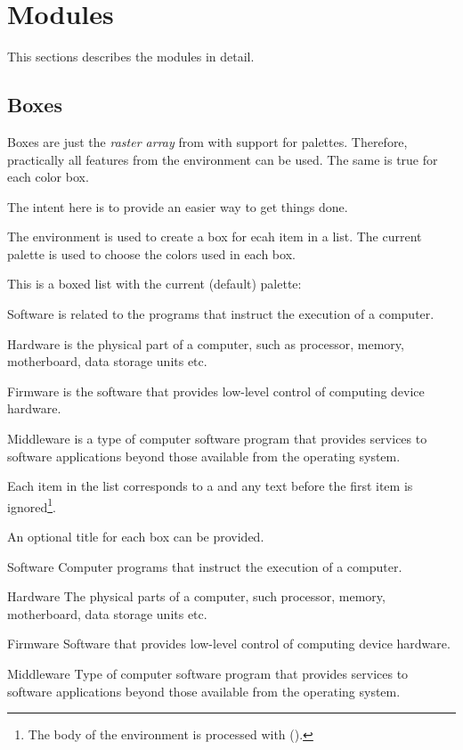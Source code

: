 \documentclass[a4paper, 11pt]{article}
\begin{document}
\section{Modules}

This sections describes the modules in detail.

\subsection{Boxes}\label{sec:boxes}

Boxes are just the \textit{raster array} from  with support for palettes. Therefore, practically all features from the  environment can be used. The same is true for each color box.

The intent here is to provide an easier way to get things done.

The environment  is used to create a box for ecah item in a list. The current palette is used to choose the colors used in each box.

\begin{example}{}
    This is a boxed list with the current (default) palette:

    \begin{PLTBoxItemize}
        \item Software is related to the programs that instruct the execution of a computer.
        \item Hardware is the physical part of a computer, such as processor, memory, motherboard, data storage units etc.
        \item Firmware is the software that provides low-level control of computing device hardware.
        \item Middleware is a type of computer software program that provides services to software applications beyond those available from the operating system.
    \end{PLTBoxItemize}
\end{example}

Each item in the list corresponds to a  and any text before the first item is ignored\footnote{The body of the environment is processed with  ().}.

An optional title for each box can be provided.

\begin{example}{}
    \begin{PLTBoxItemize}
        \item[Software] Computer programs that instruct the execution of a computer.
        \item[Hardware] The physical parts of a computer, such processor, memory, motherboard, data storage units etc.
        \item[Firmware] Software that provides low-level control of computing device hardware.
        \item[Middleware] Type of computer software program that provides services to software applications beyond those available from the operating system.
    \end{PLTBoxItemize}
\end{example}
\end{document}
